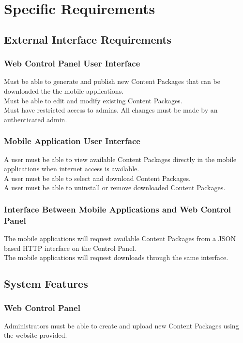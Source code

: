 \documentclass[letterpaper, 10pt,titlepage]{article}
\begin{document}
\section{Specific Requirements}
\subsection{External Interface Requirements}
\subsubsection{Web Control Panel User Interface}
Must be able to generate and publish new Content Packages that can be downloaded the the mobile applications.\\
Must be able to edit and modify existing Content Packages.\\
Must have restricted access to admins. All changes must be made by an authenticated admin.

\subsubsection{Mobile Application User Interface}
A user must be able to view available Content Packages directly in the mobile applications when internet access is available. \\
A user must be able to select and download Content Packages.\\
A user must be able to uninstall or remove downloaded Content Packages.

\subsubsection{Interface Between Mobile Applications and Web Control Panel}
The mobile applications will request available Content Packages from a JSON based HTTP interface on the Control Panel. \\
The mobile applications will request downloads through the same interface.


\subsection{System Features}
\subsubsection{Web Control Panel}
Administrators must be able to create and upload new Content Packages using the website provided.
\end{document}
